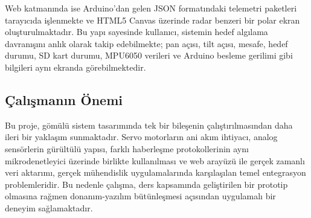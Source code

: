 Web katmanında ise Arduino'dan gelen JSON formatındaki telemetri paketleri tarayıcıda işlenmekte ve HTML5 Canvas üzerinde radar benzeri bir polar ekran oluşturulmaktadır. Bu yapı sayesinde kullanıcı, sistemin hedef algılama davranışını anlık olarak takip edebilmekte; pan açısı, tilt açısı, mesafe, hedef durumu, SD kart durumu, MPU6050 verileri ve Arduino besleme gerilimi gibi bilgileri aynı ekranda görebilmektedir.

\subsection{Çalışmanın Önemi}
Bu proje, gömülü sistem tasarımında tek bir bileşenin çalıştırılmasından daha ileri bir yaklaşım sunmaktadır. Servo motorların ani akım ihtiyacı, analog sensörlerin gürültülü yapısı, farklı haberleşme protokollerinin aynı mikrodenetleyici üzerinde birlikte kullanılması ve web arayüzü ile gerçek zamanlı veri aktarımı, gerçek mühendislik uygulamalarında karşılaşılan temel entegrasyon problemleridir. Bu nedenle çalışma, ders kapsamında geliştirilen bir prototip olmasına rağmen donanım-yazılım bütünleşmesi açısından uygulamalı bir deneyim sağlamaktadır.
